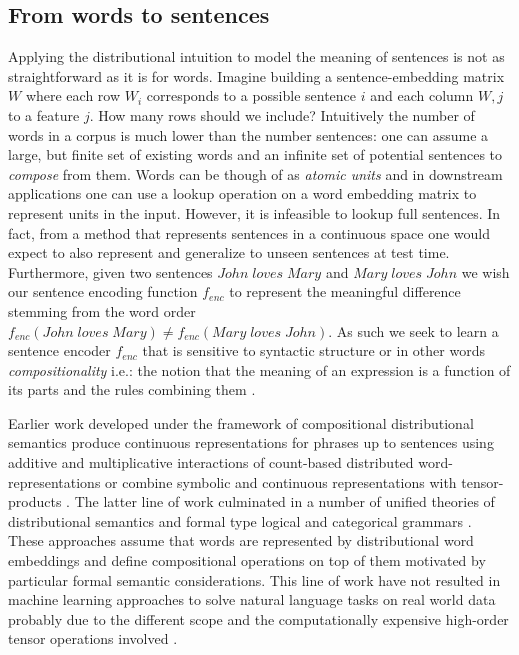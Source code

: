 \subsection{From words to sentences}
\label{sec:sentences}
Applying the distributional intuition to model the meaning of sentences is not as straightforward
as it is for words.
Imagine building a sentence-embedding matrix $W$ where each row $W_i$ corresponds to
a possible sentence $i$ and each column $W,j$ to a feature $j$.
How many rows should we include? Intuitively the number of words in a corpus is much
lower than the number sentences: one can assume a large, but finite set
of existing words and an infinite set of
potential sentences to \emph{compose} from them.
Words can be though of as \emph{atomic units} and
in downstream applications one can use a lookup operation on a word embedding matrix
to represent units in the input. However, it is infeasible to lookup full sentences.
In fact, from a method that represents sentences in a continuous space one would expect
to also represent and generalize to unseen sentences at test time.
Furthermore, given two sentences $\mathit{John \; loves \; Mary}$ and
$\mathit{Mary \; loves \; John}$ we wish our sentence encoding function
$f_{enc}$ to represent the meaningful difference stemming from the word order
$f_{enc}(\mathit{John \; loves \; Mary}) \neq f_{enc}(\mathit{Mary \; loves \; John})$.
As such we seek to learn a sentence encoder $f_{enc}$ that is sensitive to
syntactic structure or in other words \emph{compositionality} i.e.:
the notion that the meaning of an expression is
a function of its parts and the rules combining them \citep{montague1970english}.

Earlier work developed under the framework of compositional distributional semantics produce
continuous representations for phrases up to sentences using additive and multiplicative interactions
of count-based distributed word-representations \citep{mitchell2008vector} or combine symbolic and
continuous representations with tensor-products \citep{clark2007combining}.
The latter line of work culminated in a number of unified theories of
distributional semantics and formal type logical and categorical grammars
\citep{coecke2010mathematical,clarke2012context,baroni2014frege}.
These approaches assume that words are represented by distributional word embeddings
and define compositional operations on top of them motivated by particular formal
semantic considerations. This line of work have not resulted in
machine learning approaches to solve natural language tasks
on real world data probably due to the different scope and
the computationally expensive high-order
tensor operations involved \citep{bowman2016modeling}.

